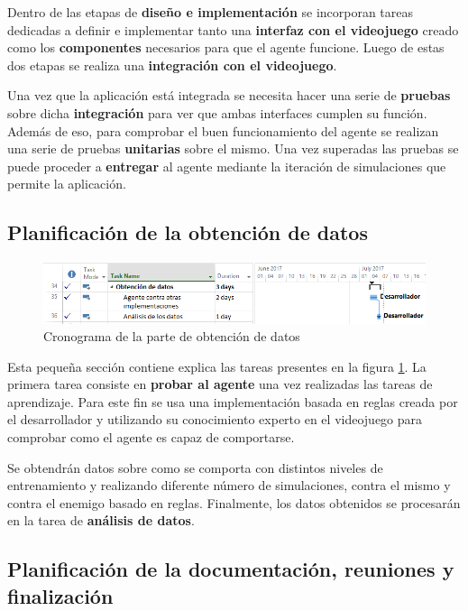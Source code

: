 Dentro de las etapas de \textbf{diseño e implementación} se incorporan tareas dedicadas a definir e implementar tanto una \textbf{interfaz con el videojuego} creado como los \textbf{componentes} necesarios para que el agente funcione. Luego de estas dos etapas se realiza una \textbf{integración con el videojuego}.

\bigskip

Una vez que la aplicación está integrada se necesita hacer una serie de \textbf{pruebas} sobre dicha \textbf{integración} para ver que ambas interfaces cumplen su función. Además de eso, para comprobar el buen funcionamiento del agente se realizan una serie de pruebas \textbf{unitarias} sobre el mismo. Una vez superadas las pruebas se puede proceder a \textbf{entregar} al agente mediante la iteración de simulaciones que permite la aplicación.


\subsection{Planificación de la obtención de datos}

\begin{figure}
	\centerline{\includegraphics[width=19cm]{otros/capturasPlanificacion/obtencion_de_datos.PNG}}
	\caption{Cronograma de la parte de obtención de datos}
	\label{plan:datos}
\end{figure}


Esta pequeña sección contiene explica las tareas presentes en la figura \ref{plan:datos}. La primera tarea consiste en \textbf{probar al agente} una vez realizadas las tareas de aprendizaje. Para este fin se usa una implementación basada en reglas creada por el desarrollador y utilizando su conocimiento experto en el videojuego para comprobar como el agente es capaz de comportarse.

Se obtendrán datos sobre como se comporta con distintos niveles de entrenamiento y realizando diferente número de simulaciones, contra el mismo y contra el enemigo basado en reglas. Finalmente, los datos obtenidos se procesarán en la tarea de \textbf{análisis de datos}.


\subsection{Planificación de la documentación, reuniones y finalización}

